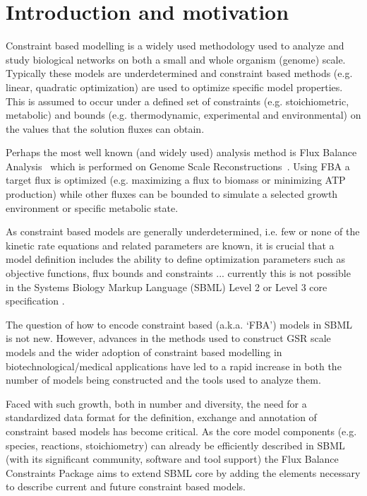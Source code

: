 
\section{ Introduction and motivation }
\label{intro}

Constraint based modelling is a widely used methodology used to analyze and study biological networks on both a small and whole organism (genome) scale. Typically these models are underdetermined and constraint based methods (e.g. linear, quadratic optimization) are used to optimize specific model properties. This is assumed to occur under a defined set of constraints (e.g. stoichiometric, metabolic) and bounds (e.g. thermodynamic, experimental and environmental) on the values that the solution fluxes can obtain.

Perhaps the most well known (and widely used) analysis method is Flux Balance Analysis~\citep[FBA; ][]{orth_2010} which is performed on Genome Scale Reconstructions~\citep[GSR's; ][]{oberhardt_2009}. Using FBA a target flux is optimized (e.g. maximizing a flux to biomass or minimizing ATP production) while other fluxes can be bounded to simulate a selected growth environment or specific metabolic state.

As constraint based models are generally underdetermined, i.e. few or none of the kinetic rate equations and related parameters are known, it is crucial that a model definition includes the ability to define optimization parameters such as objective functions, flux bounds and constraints ... currently this is not possible in the Systems Biology Markup Language (SBML) Level 2 or Level 3 core specification \citep{sbml, sbml3core}.

The question of how to encode constraint based (a.k.a. `FBA') models in SBML is not new. However, advances in the methods used to construct GSR scale models and the wider adoption of constraint based modelling in biotechnological/medical applications have led to a rapid increase in both the number of models being constructed and the tools used to analyze them.

Faced with such growth, both in number and diversity, the need for a standardized data format for the definition, exchange and annotation of constraint based models has become critical. As the core model components (e.g. species, reactions, stoichiometry) can already be efficiently described in SBML (with its significant community, software and tool support) the Flux Balance Constraints Package aims to extend SBML core by adding the elements necessary to describe current and future constraint based models.


